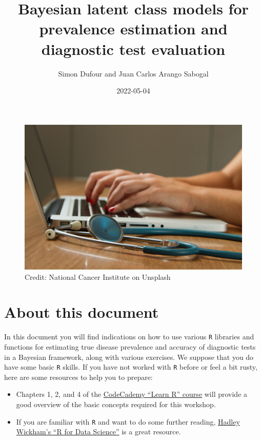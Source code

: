 \documentclass[
]{book}
\title{Bayesian latent class models for prevalence estimation and
diagnostic test evaluation}
\author{Simon Dufour and Juan Carlos Arango Sabogal}
\date{2022-05-04}
\begin{document}
\frontmatter
\maketitle

\mainmatter
\begin{figure}
\centering
\includegraphics{Figures/national-cancer-institute-NFvdKIhxYlU-unsplash.jpg}
\caption{Credit: National Cancer Institute on Unsplash}
\end{figure}

\hypertarget{about-this-document}{%
\chapter{About this document}\label{about-this-document}}

In this document you will find indications on how to use various
\texttt{R} libraries and functions for estimating true disease
prevalence and accuracy of diagnostic tests in a Bayesian framework,
along with various exercises. We suppose that you do have some basic
\texttt{R} skills. If you have not worked with \texttt{R} before or feel
a bit rusty, here are some resources to help you to prepare:

\begin{itemize}
\item
  Chapters 1, 2, and 4 of the
  \href{https://www.codecademy.com/learn/learn-r}{CodeCademy ``Learn R''
  course} will provide a good overview of the basic concepts required
  for this workshop.
\item
  If you are familiar with \texttt{R} and want to do some further
  reading, \href{https://r4ds.had.co.nz/}{Hadley Wickham's ``R for Data
  Science''} is a great resource.
\end{itemize}
\end{document}
